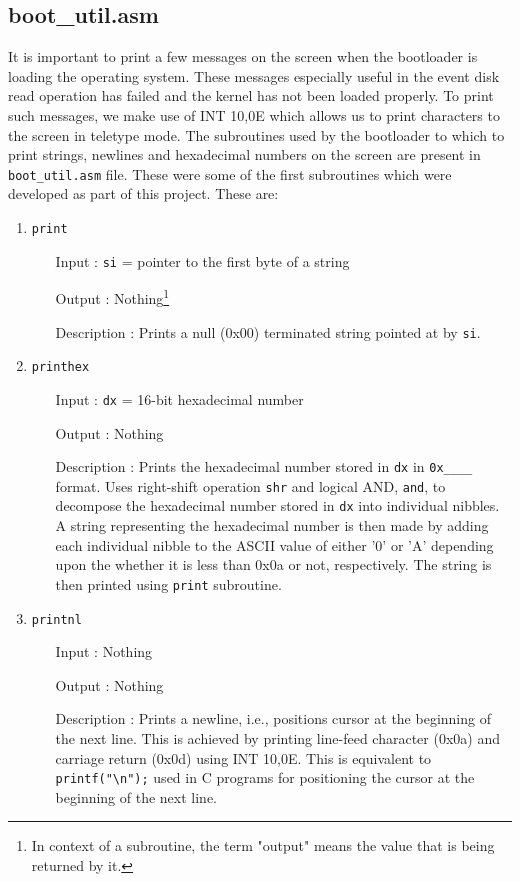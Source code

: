 \subsection{boot\_util.asm}
It is important to print a few messages on the screen when the bootloader is loading the operating system. These messages especially useful in the event disk read operation has failed and the kernel has not been loaded properly. To print such messages, we make use of INT 10,0E which allows us to print characters to the screen in teletype mode. The subroutines used by the bootloader to which to print strings, newlines and hexadecimal numbers on the screen are present in \texttt{boot\_util.asm} file. These were some of the first subroutines which were developed as part of this project. These are:
\begin{enumerate}
  \item \texttt{print}
  		\begin{enumerate}[align=parleft, labelsep=2cm, leftmargin=1.06in]
  		  \item[Input]: \verb|si| = pointer to the first byte of a string
  		  \item[Output]: Nothing\footnote[1]{In context of a subroutine, the term "output" means the value that is being returned by it.}
  		  \item[Description]: Prints a null (0x00) terminated string pointed at by \verb|si|.
  		\end{enumerate}
  \item \texttt{printhex}
  		\begin{enumerate}[align=parleft, labelsep=2cm, leftmargin=1.06in]
  		  \item[Input]: \texttt{dx} = 16-bit hexadecimal number
  		  \item[Output]: Nothing
  		  \item[Description]: Prints the hexadecimal number stored in \verb|dx| in \texttt{0x\_\_\_\_} format. Uses right-shift operation \texttt{shr} and logical AND, \texttt{and}, to decompose the hexadecimal number stored in \verb|dx| into individual nibbles. A string representing the hexadecimal number is then made by adding each individual nibble to the ASCII value of either '0' or 'A' depending upon the whether it is less than 0x0a or not, respectively. The string is then printed using \texttt{print} subroutine.
  		\end{enumerate} 
  \item \texttt{printnl}
  		\begin{enumerate}[align=parleft, labelsep=2cm, leftmargin=1.06in]
  		  \item[Input]: Nothing
  		  \item[Output]: Nothing
  		  \item[Description]: Prints a newline, i.e., positions cursor at the beginning of the next line. This is achieved by printing line-feed character (0x0a) and carriage return (0x0d) using INT 10,0E. This is equivalent to \texttt{printf("\textbackslash n");} used in C programs for positioning the cursor at the beginning of the next line.
  		\end{enumerate}
\end{enumerate}

